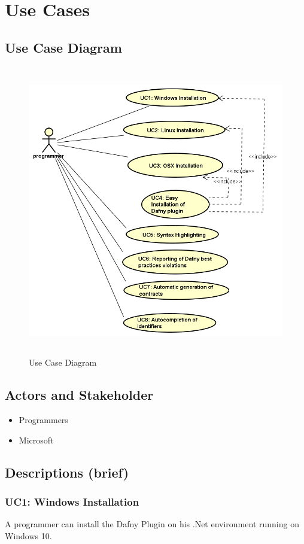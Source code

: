 \section{Use Cases}
\subsection{Use Case Diagram}
\begin{figure}[h]
	\centering
	\includegraphics[width=1\linewidth, height=5in]{"./img/UseCase"}
	\caption{Use Case Diagram}
	\label{fig:usecase-diagram}
\end{figure}
\subsection{Actors and Stakeholder}
\begin{itemize}
	\item Programmers
	\item Microsoft
\end{itemize}
\subsection{Descriptions (brief)}
\subsubsection{UC1: Windows Installation}
A programmer can install the Dafny Plugin on his .Net environment running on Windows 10.
